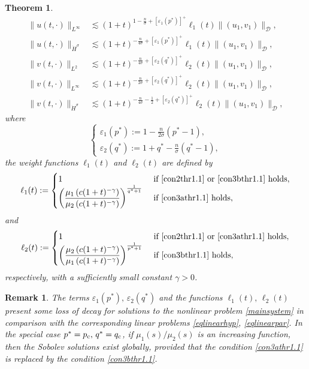 \documentclass[11pt,reqno]{amsart}
\numberwithin{equation}{section}
\newtheorem{theorem}{Theorem}[section]
\newtheorem{remark}{Remark}[section]
\begin{document}
\begin{theorem}
$$\begin{aligned}
\|u(t,\cdot)\|_{L^{\infty}} &\lesssim (1+t)^{1-\frac{n}{\sigma}+[\varepsilon_1(p^*)]^{+}}\ell_1(t)\|(u_1,v_1)\|_{\mathcal{D}},\\
\|u(t, \cdot)\|_{\dot{H}^{\sigma}} &\lesssim (1+t)^{-\frac{n}{4\sigma}+[\varepsilon_1(p^*)]^{+}}\ell_1(t)\|(u_1,v_1)\|_{\mathcal{D}},\\
\|v(t, \cdot)\|_{L^2} &\lesssim (1+t)^{-\frac{n}{4\sigma}+[\varepsilon_2(q^*)]^{+}}\ell_2(t)\|(u_1,v_1)\|_{\mathcal{D}},\\
\|v(t,\cdot)\|_{L^{\infty}} &\lesssim (1+t)^{-\frac{n}{2\sigma}+[\varepsilon_2(q^*)]^{+}}\ell_2(t)\|(u_1,v_1)\|_{\mathcal{D}},\\
\|v(t,\cdot)\|_{\dot{H}^{\sigma}} &\lesssim (1+t)^{-\frac{n}{4\sigma}-\frac{1}{2}+[\varepsilon_2(q^*)]^{+}}\ell_2(t)\|(u_1,v_1)\|_{\mathcal{D}},
\end{aligned}
$$
where
\begin{equation}\label{con4thr1.1}
\begin{cases}
    \varepsilon_1(p^*):=1-\frac{n}{2\sigma}(p^*-1),\\
    \varepsilon_2(q^*):=1+q^*-\frac{n}{\sigma}(q^*-1),
\end{cases}
\end{equation}
the weight functions $\ell_1(t)$ and $ \ell_2(t)$ are defined by
\begin{equation}\label{con5thr1.1}
\ell_1(t):= 
\begin{cases}
1 &\text { if \eqref{con2thr1.1} or \eqref{con3bthr1.1} holds}, \\
\left(\dfrac{\mu_1\left(c(1+t)^{-\gamma}\right)}{\mu_2\left(c(1+t)^{-\gamma}\right)}\right)^{\frac{1}{q^*+1}}  &\text { if \eqref{con3athr1.1} holds},
\end{cases}
\end{equation}
and
\begin{equation}\label{con6thr1.1}
\ell_2(t):=
\begin{cases}
1 &\text { if \eqref{con2thr1.1} or \eqref{con3athr1.1} holds}, \\
\left(\dfrac{\mu_2\left(c(1+t)^{-\gamma}\right)}{\mu_1\left(c(1+t)^{-\gamma}\right)}\right)^{\frac{1}{p^*+1}}  &\text { if \eqref{con3bthr1.1} holds},
\end{cases}
\end{equation}
respectively, with a sufficiently small constant $\gamma>0$. 
\end{theorem}
\begin{remark}
{\rm
   The terms $\varepsilon_1(p^*),\, \varepsilon_2(q^*)$ and the functions $\ell_1(t),\,\ell_2(t)$ present some loss of decay for solutions to the nonlinear problem \eqref{mainsystem} in comparison with the corresponding linear problems \eqref{eqlinearhyp}, \eqref{eqlinearpar}. In the special case $p^*=p_{\rm c},\,q^*=q_{\rm c}$, if $\mu_1(s)/\mu_2(s)$ is an increasing function, then the Sobolev solutions exist globally, provided that the condition \eqref{con3athr1.1} is replaced by the condition \eqref{con3bthr1.1}.
}
\end{remark}
\end{document}

